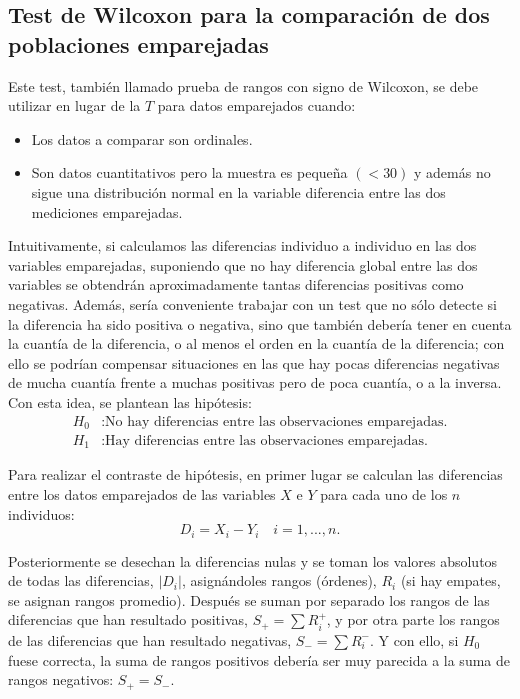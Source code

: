 \begin{description}
\subsection{Test de Wilcoxon para la comparación de dos poblaciones emparejadas}
Este test, también llamado prueba de rangos con signo de Wilcoxon, se debe utilizar en lugar de la $T$ para datos emparejados cuando:

\begin{itemize}
\item Los datos a comparar son ordinales.
\item Son datos cuantitativos pero la muestra es pequeña $(<30)$ y además no sigue una distribución normal en la variable diferencia entre las dos mediciones emparejadas.
\end{itemize}

Intuitivamente, si calculamos las diferencias individuo a individuo en las dos variables emparejadas, suponiendo que no hay diferencia global entre las dos variables se obtendrán aproximadamente tantas diferencias positivas como negativas. Además, sería conveniente trabajar con un test que no sólo detecte si la diferencia ha sido positiva o negativa, sino que también debería tener en cuenta la cuantía de la diferencia, o al menos el orden en la cuantía de la diferencia; con ello se podrían compensar situaciones en las que hay pocas diferencias negativas de mucha cuantía frente a muchas positivas pero de poca cuantía, o a la inversa. Con esta idea, se plantean las hipótesis:
\begin{align*}
H_0 &: \textrm{No hay diferencias entre las observaciones emparejadas.}\\
H_1 &: \textrm{Hay diferencias entre las observaciones emparejadas.}
\end{align*}

Para realizar el contraste de hipótesis, en primer lugar se calculan las diferencias entre los datos emparejados de las variables $X$ e $Y$ para cada uno de los $n$ individuos:
\[
D_i = X_i-Y_i \quad i = 1,...,n.
\]

Posteriormente se desechan la diferencias nulas y se toman los valores absolutos de todas las diferencias, $\left|{D_i}\right|$, asignándoles rangos (órdenes), $R_i$ (si hay empates, se asignan rangos promedio). Después se suman por separado los rangos de las diferencias que han resultado positivas, $S_{+}=\sum{R_{i}^{+}}$, y por otra parte los rangos de las diferencias que han resultado negativas, $S_{-}=\sum{R_{i}^{-}}$. Y con ello, si $H_0$ fuese correcta, la suma de rangos positivos debería ser muy parecida a la suma de rangos negativos: $S_+=S_-$.


\end{description}
